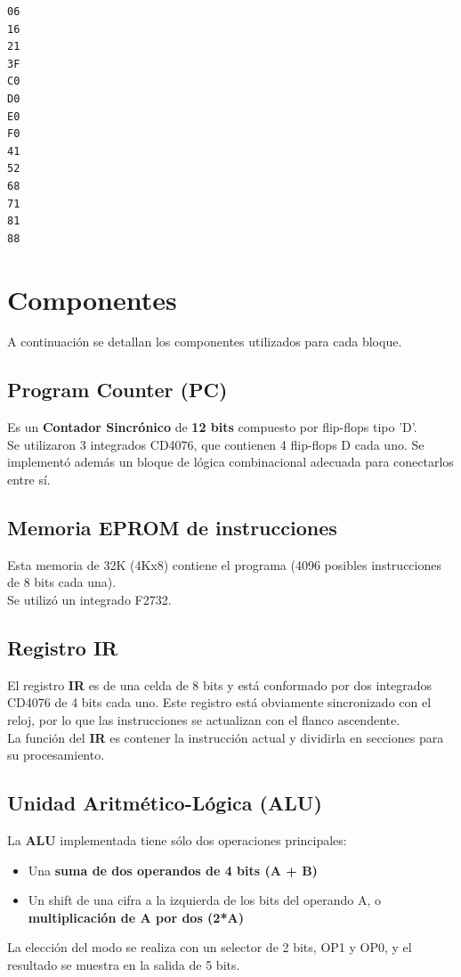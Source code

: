 \documentclass{sciposter}
\begin{document}
\begin{multicols*}{2}
\begin{center}
\begin{lstlisting}
06
16
21
3F
C0
D0
E0
F0
41
52
68
71
81
88
\end{lstlisting}
\end{center}

\section{Componentes}

A continuación se detallan los componentes utilizados para cada bloque.

\subsection{Program Counter (PC)}
Es un \textbf{Contador Sincrónico} de \textbf{12 bits} compuesto por flip-flops tipo 'D'.\\
Se utilizaron 3 integrados CD4076, que contienen 4 flip-flops D cada uno. Se implementó además un bloque de lógica combinacional adecuada para conectarlos entre sí.

\subsection{Memoria EPROM de instrucciones}
Esta memoria de 32K (4Kx8) contiene el programa (4096 posibles instrucciones de 8 bits cada una).\\
Se utilizó un integrado F2732.

\subsection{Registro IR}
El registro \textbf{IR} es de una celda de 8 bits y está conformado por dos integrados CD4076 de 4 bits cada uno.
Este registro está obviamente sincronizado con el reloj, por lo que las instrucciones se actualizan con el flanco ascendente.\\
La función del \textbf{IR} es contener la instrucción actual y dividirla en secciones para su procesamiento.

\subsection{Unidad Aritmético-Lógica (ALU)}
La \textbf{ALU} implementada tiene sólo dos operaciones principales: 
\begin{itemize}
    \item Una \textbf{suma de dos operandos de 4 bits (A + B)}
    \item Un shift de una cifra a la izquierda de los bits del operando A, o \textbf{multiplicación de A por dos (2*A)}
\end{itemize}
La elección del modo se realiza con un selector de 2 bits, OP1 y OP0, y el resultado se muestra en la salida de 5 bits.\\


\end{multicols*}
\end{document}
